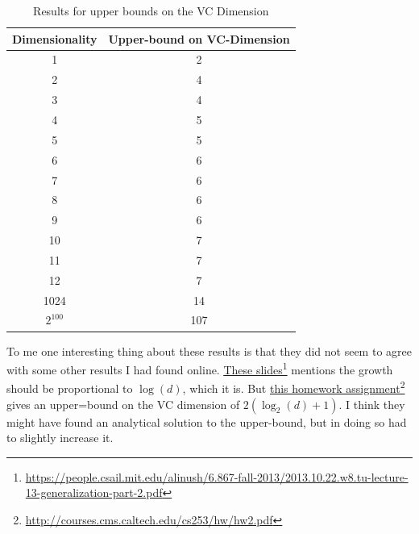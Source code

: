 \documentclass[11pt,a4paper]{article}
\begin{document}
\begin{table}
    \centering
    \begin{tabular}{|c|c|}
    \hline
    Dimensionality & Upper-bound on VC-Dimension \\ \hline
    1              & 2                            \\ \hline
    2              & 4                            \\ \hline
    3              & 4                            \\ \hline
    4              & 5                            \\ \hline
    5              & 5                            \\ \hline
    6              & 6                            \\ \hline
    7              & 6                           \\ \hline
    8              & 6                            \\ \hline

    9              & 6                            \\ \hline
    10              & 7                            \\ \hline
    11             & 7                            \\ \hline
    12              & 7                            \\ \hline

    
    1024           & 14                            \\ \hline
    $2^{100}$        & 107 \\
    \hline
    \end{tabular}
    \caption{Results for upper bounds on the VC Dimension}
    \label{tab:upper-bound-vc}
\end{table}

To me one interesting thing about these results is that they did not seem to agree with some other results I had found online. \href{https://people.csail.mit.edu/alinush/6.867-fall-2013/2013.10.22.w8.tu-lecture-13-generalization-part-2.pdf}{\underline{These slides}}\footnote{\url{https://people.csail.mit.edu/alinush/6.867-fall-2013/2013.10.22.w8.tu-lecture-13-generalization-part-2.pdf}} mentions the growth should be proportional to $\log(d)$, which it is. But \href{http://courses.cms.caltech.edu/cs253/hw/hw2.pdf}{\underline{this homework assignment}}\footnote{\url{http://courses.cms.caltech.edu/cs253/hw/hw2.pdf}} gives an upper=bound on the VC dimension of $2(\log_2(d) + 1)$. I think they might have found an analytical solution to the upper-bound, but in doing so had to slightly increase it.
\end{document}
